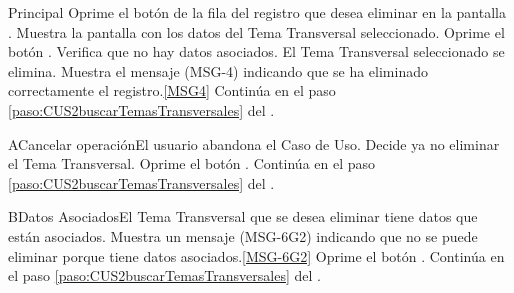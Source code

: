 	\begin{UCtrayectoria}{Principal}
			\UCpaso[\UCactor] Oprime el botón  de la fila del registro que desea eliminar en la pantalla .	
			\UCpaso Muestra la pantalla  con los datos del Tema Transversal seleccionado. 
			\UCpaso [\UCactor] Oprime el botón . 
			\UCpaso Verifica que no hay datos asociados. 
			\UCpaso El Tema Transversal seleccionado se elimina.
			\UCpaso Muestra el mensaje (MSG-4) indicando que se ha eliminado correctamente el registro.\ref{MSG4}
			\UCpaso Continúa en el paso \ref{paso:CUS2buscarTemasTransversales} del .
	\end{UCtrayectoria}

		\begin{UCtrayectoriaA}{A}{Cancelar operación}{El usuario abandona el Caso de Uso.}
			\UCpaso[\UCactor] Decide ya no eliminar el Tema Transversal.
			\UCpaso[\UCactor] Oprime el botón .
			\UCpaso Continúa en el paso \ref{paso:CUS2buscarTemasTransversales} del .
		\end{UCtrayectoriaA}
		
		\begin{UCtrayectoriaA}{B}{Datos Asociados}{El Tema Transversal que se desea eliminar tiene datos que están asociados.}
			\UCpaso Muestra un mensaje (MSG-6G2) indicando que no se puede eliminar porque tiene datos asociados.\ref{MSG-6G2}
			\UCpaso [\UCactor] Oprime el botón .
			\UCpaso Continúa en el paso \ref{paso:CUS2buscarTemasTransversales} del .
		\end{UCtrayectoriaA}
